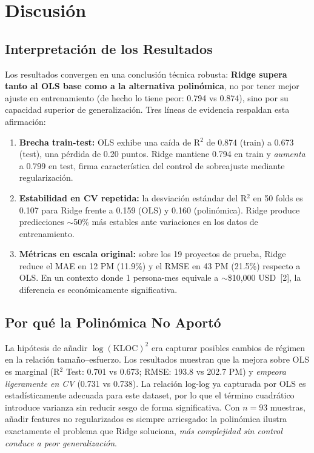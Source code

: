 \documentclass[11pt,a4paper]{article}
\begin{document}
\section{Discusión}

\subsection{Interpretación de los Resultados}

Los resultados convergen en una conclusión técnica robusta: \textbf{Ridge supera tanto al OLS base como a la alternativa polinómica}, no por tener mejor ajuste en entrenamiento (de hecho lo tiene peor: 0.794 vs 0.874), sino por su capacidad superior de generalización. Tres líneas de evidencia respaldan esta afirmación:

\begin{enumerate}[itemsep=2pt,leftmargin=1.5em]
\item \textbf{Brecha train-test:} OLS exhibe una caída de R$^2$ de 0.874 (train) a 0.673 (test), una pérdida de 0.20 puntos. Ridge mantiene 0.794 en train y \emph{aumenta} a 0.799 en test, firma característica del control de sobreajuste mediante regularización.
\item \textbf{Estabilidad en CV repetida:} la desviación estándar del R$^2$ en 50 folds es 0.107 para Ridge frente a 0.159 (OLS) y 0.160 (polinómica). Ridge produce predicciones $\sim$50\% más estables ante variaciones en los datos de entrenamiento.
\item \textbf{Métricas en escala original:} sobre los 19 proyectos de prueba, Ridge reduce el MAE en 12 PM (11.9\%) y el RMSE en 43 PM (21.5\%) respecto a OLS. En un contexto donde 1 persona-mes equivale a $\sim$\$10{,}000 USD~[2], la diferencia es económicamente significativa.
\end{enumerate}

\subsection{Por qué la Polinómica No Aportó}

La hipótesis de añadir $\log(\mathrm{KLOC})^2$ era capturar posibles cambios de régimen en la relación tamaño--esfuerzo. Los resultados muestran que la mejora sobre OLS es marginal (R$^2$ Test: 0.701 vs 0.673; RMSE: 193.8 vs 202.7 PM) y \emph{empeora ligeramente en CV} (0.731 vs 0.738). La relación log-log ya capturada por OLS es estadísticamente adecuada para este dataset, por lo que el término cuadrático introduce varianza sin reducir sesgo de forma significativa. Con $n=93$ muestras, añadir features no regularizados es siempre arriesgado: la polinómica ilustra exactamente el problema que Ridge soluciona, \emph{más complejidad sin control conduce a peor generalización}.
\end{document}
